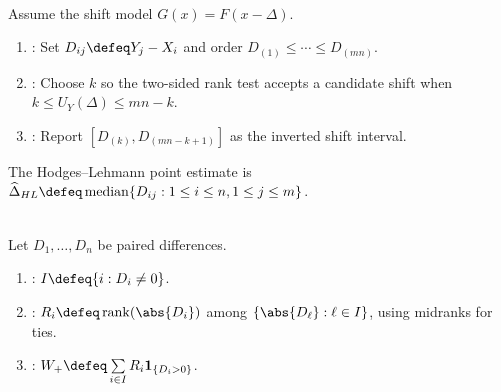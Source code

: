\begin{method} \label{meth:mann-whitney-shift-interval} \\
Assume the shift model $G(x)=F(x-\Delta)$.
\begin{enumerate}[label=(\roman*)]
\setlength{\itemsep}{0pt}
\item {}: Set $D_{ij}\defeq Y_j-X_i$ and order $D_{(1)}\leq\cdots\leq D_{(mn)}$.
\item {}: Choose $k$ so the two-sided rank test accepts a candidate shift when $k\leq U_Y(\Delta)\leq mn-k$.
\item {}: Report $[D_{(k)},D_{(mn-k+1)}]$ as the inverted shift interval.
\end{enumerate}
The Hodges--Lehmann point estimate is $\widehat{\Delta}_{HL}\defeq\operatorname{median}\{D_{ij}:1\leq i\leq n,1\leq j\leq m\}$.
\end{method}

\begin{definition} \label{def:signed-rank-test-statistic} \\
Let $D_1,\ldots,D_n$ be paired differences.
\begin{enumerate}[label=(\roman*)]
\setlength{\itemsep}{0pt}
\item {}: $I\defeq\{i:D_i\neq0\}$.
\item {}: $R_i\defeq\operatorname{rank}(\abs{D_i})$ among $\{\abs{D_\ell}:\ell\in I\}$, using midranks for ties.
\item {}: $W_+\defeq\sum\limits_{i\in I}R_i\mathbf{1}_{\{D_i>0\}}$.
\end{enumerate}
\end{definition}

